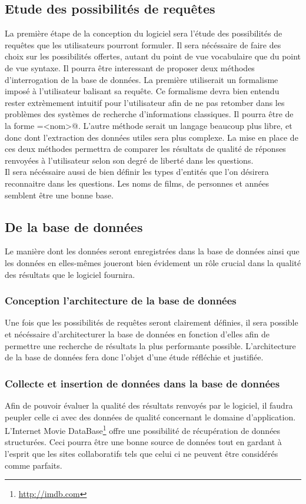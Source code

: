 \documentclass[12pt]{article}
\begin{document}
\subsection{Etude des possibilités de requêtes}
La première étape de la conception du logiciel sera l'étude des possibilités de requêtes que les utilisateurs pourront formuler.
Il sera nécéssaire de faire des choix sur les possibilités offertes, autant du point de vue vocabulaire que du point de vue syntaxe.
Il pourra être interessant de proposer deux méthodes d'interrogation de la base de données.
La première utiliserait un formalisme imposé à l'utilisateur balisant sa requête.
Ce formalisme devra bien entendu rester extrèmement intuitif pour l'utilisateur afin de ne pas retomber dans les problèmes des systèmes de recherche d'informations classiques.
Il pourra être de la forme \verb@actor=<nom>@. 
L'autre méthode serait un langage beaucoup plus libre, et donc dont l'extraction des données utiles sera plus complexe. 
La mise en place de ces deux méthodes permettra de comparer les résultats de qualité de réponses renvoyées à l'utilisateur selon son degré de liberté dans les questions. \\

Il sera nécéssaire aussi de bien définir les types d'entités que l'on désirera reconnaitre dans les questions.
Les noms de films, de personnes et années semblent être une bonne base. 
\subsection{De la base de données}
Le manière dont les données seront enregistrées dans la base de données ainsi que les données en elles-mêmes joueront bien évidement un rôle crucial dans la qualité des résultats que le logiciel fournira.
\subsubsection{Conception l'architecture de la base de données}
Une fois que les possibilités de requêtes seront clairement définies, il sera possible et nécéssaire d'architecturer la base de données en fonction d'elles afin de permettre une recherche de résultats la plus performante possible.
L'architecture de la base de données fera donc l'objet d'une étude réfléchie et justifiée.
\subsubsection{Collecte et insertion de données dans la base de données}
Afin de pouvoir évaluer la qualité des résultats renvoyés par le logiciel, il faudra peupler celle ci avec des données de qualité concernant le domaine d'application.
L'Internet Movie DataBase\footnote{\url{http://imdb.com}} offre une possibilité de récupération de données structurées.
Ceci pourra être une bonne source de données tout en gardant à l'esprit que les sites collaboratifs tels que celui ci ne peuvent être considérés comme parfaits. \\
\end{document}
